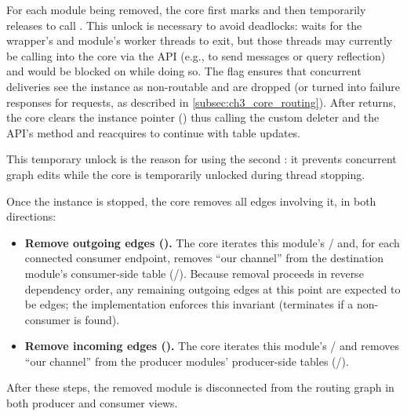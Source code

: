 For each module being removed, the core first marks  and then temporarily releases  to call .
This unlock is necessary to avoid deadlocks:  waits for the wrapper's and module's worker threads to exit, but those threads may currently be calling into the core via the  API (e.g., to send messages or query reflection) and would be blocked on  while doing so.
The  flag ensures that concurrent deliveries see the instance as non-routable and are dropped (or turned into failure responses for requests, as described in \autoref{subsec:ch3_core_routing}).
After  returns, the core clears the instance pointer () thus calling the custom deleter and the API's  method and reacquires  to continue with table updates. 

This temporary unlock is the reason for using the second : it prevents concurrent graph edits while the core is temporarily unlocked during thread stopping.


Once the instance is stopped, the core removes all edges involving it, in both directions:
\begin{itemize}
    \item \textbf{Remove outgoing edges ().}
    The core iterates this module's / and, for each connected consumer endpoint, removes ``our channel'' from the destination module's consumer-side table (/).
    Because removal proceeds in reverse dependency order, any remaining outgoing edges at this point are expected to be  edges; the implementation enforces this invariant (terminates if a non- consumer is found).
    \item \textbf{Remove incoming edges ().}
    The core iterates this module's / and removes ``our channel'' from the producer modules' producer-side tables (/).
\end{itemize}
After these steps, the removed module is disconnected from the routing graph in both producer and consumer views.


